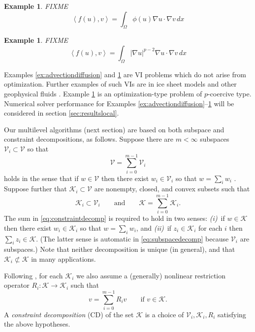 \documentclass[letterpaper,final,12pt,reqno]{amsart}
\theoremstyle{cstyle}
\theoremstyle{dstyle}
\newtheorem{example}[theorem]{Example}
\numberwithin{equation}{section}
\numberwithin{figure}{section}
\numberwithin{table}{section}
\numberwithin{theorem}{section}
\newcommand{\grad}{\nabla}
\newcommand{\cK}{\mathcal{K}}
\newcommand{\cV}{\mathcal{V}}
\newcommand{\ip}[2]{\left<#1,#2\right>}
\begin{document}
\begin{example}  \label{ex:porousgeneralization}  FIXME
\begin{equation}
\ip{f(u)}{v} = \int_\Omega \phi(u) \grad u \cdot \grad v\,dx \label{eq:porousgeneralization}
\end{equation}
\end{example}

\begin{example}  \label{ex:plaplacian}  FIXME
\begin{equation}
\ip{f(u)}{v} = \int_\Omega |\grad u|^{p-2} \grad u \cdot \grad v\,dx \label{eq:plaplacian}
\end{equation}
\end{example}

Examples \ref{ex:advectiondiffusion} and \ref{ex:porousgeneralization} are VI problems which do not arise from optimization.  Further examples of such VIs are in ice sheet models \cite{Calvoetal2002,JouvetBueler2012} and other geophysical fluids \cite{Bueler2021conservation}.  Example \ref{ex:plaplacian} is an optimization-type problem of $p$-coercive type.  Numerical solver performance for Examples \ref{ex:advectiondiffusion}--\ref{ex:plaplacian} will be considered in section \ref{sec:resultslocal}.  %

Our multilevel algorithms (next section) are based on both subspace and constraint decompositions, as follows.  Suppose there are $m<\infty$ subspaces $\cV_i \subset \cV$ so that
\begin{equation}
\cV = \sum_{i=0}^{m-1} \cV_i \label{eq:subspacedecomp}
\end{equation}
holds in the sense that if $w \in \cV$ then there exist $w_i \in \cV_i$ so that $w = \sum_i w_i$ \cite{Xu1992}.  Suppose further that $\cK_i \subset \cV$ are nonempty, closed, and convex subsets such that
\begin{equation}
\cK_i \subset \cV_i \qquad \text{and} \qquad \cK = \sum_{i=0}^{m-1} \cK_i. \label{eq:constraintdecomp}
\end{equation}
The sum in \eqref{eq:constraintdecomp} is required to hold in two senses: \emph{(i)}~if $w \in \cK$ then there exist $w_i \in \cK_i$ so that $w = \sum_i w_i$, and \emph{(ii)}~if $z_i \in \cK_i$ for each $i$ then $\sum_i z_i \in \cK$.  (The latter sense is automatic in \eqref{eq:subspacedecomp} because $\cV_i$ are subspaces.)  Note that neither decomposition is unique (in general), and that $\cK_i \not\subset \cK$ in many applications.

Following \cite{Tai2003}, for each $\cK_i$ we also assume a (generally) nonlinear restriction operator $R_i : \cK \to \cK_i$ such that %
\begin{equation}
v = \sum_{i=0}^{m-1} R_i v \qquad \text{if } v \in \cK.  \label{eq:constraintrestrictionsum}
\end{equation}
A \emph{constraint decomposition} (CD) of the set $\cK$ is a choice of $\cV_i,\cK_i,R_i$ satisfying the above hypotheses.
\end{document}
